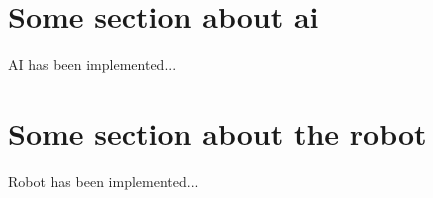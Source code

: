 \label{chapter:approach}

\section{Some section about ai}
\label{section:approach_ai}

AI has been implemented...


\section{Some section about the robot}
\label{section:approach_robot}

Robot has been implemented...

\clearpage

